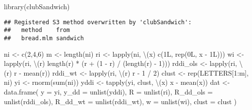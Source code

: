 \documentclass[12pt]{article}
\newenvironment{Shaded}{\begin{snugshade}}{\end{snugshade}}
\newcommand{\AttributeTok}[1]{\textcolor[rgb]{0.77,0.63,0.00}{#1}}
\newcommand{\DecValTok}[1]{\textcolor[rgb]{0.00,0.00,0.81}{#1}}
\newcommand{\FunctionTok}[1]{\textcolor[rgb]{0.00,0.00,0.00}{#1}}
\newcommand{\NormalTok}[1]{#1}
\newcommand{\OtherTok}[1]{\textcolor[rgb]{0.56,0.35,0.01}{#1}}
\newcommand{\SpecialCharTok}[1]{\textcolor[rgb]{0.00,0.00,0.00}{#1}}
\begin{document}
\begin{Shaded}
\begin{Highlighting}[]
\FunctionTok{library}\NormalTok{(clubSandwich)}
\end{Highlighting}
\end{Shaded}

\begin{verbatim}
## Registered S3 method overwritten by 'clubSandwich':
##   method    from    
##   bread.mlm sandwich
\end{verbatim}

\begin{Shaded}
\begin{Highlighting}[]
\NormalTok{ni }\OtherTok{\textless{}{-}} \FunctionTok{c}\NormalTok{(}\DecValTok{2}\NormalTok{,}\DecValTok{4}\NormalTok{,}\DecValTok{6}\NormalTok{)}
\NormalTok{m }\OtherTok{\textless{}{-}} \FunctionTok{length}\NormalTok{(ni)}
\NormalTok{ri }\OtherTok{\textless{}{-}} \FunctionTok{lapply}\NormalTok{(ni, \textbackslash{}(x) }\FunctionTok{c}\NormalTok{(1L, }\FunctionTok{rep}\NormalTok{(0L, x }\SpecialCharTok{{-}}\NormalTok{ 1L)))}
\NormalTok{wi }\OtherTok{\textless{}{-}} \FunctionTok{lapply}\NormalTok{(ri, \textbackslash{}(r) }\FunctionTok{length}\NormalTok{(r) }\SpecialCharTok{*}\NormalTok{ (r }\SpecialCharTok{+}\NormalTok{ (}\DecValTok{1} \SpecialCharTok{{-}}\NormalTok{ r) }\SpecialCharTok{/}\NormalTok{ (}\FunctionTok{length}\NormalTok{(r) }\SpecialCharTok{{-}} \DecValTok{1}\NormalTok{)))}
\NormalTok{rddi\_ols }\OtherTok{\textless{}{-}} \FunctionTok{lapply}\NormalTok{(ri, \textbackslash{}(r) r }\SpecialCharTok{{-}} \FunctionTok{mean}\NormalTok{(r))}
\NormalTok{rddi\_wt }\OtherTok{\textless{}{-}} \FunctionTok{lapply}\NormalTok{(ri, \textbackslash{}(r) r }\SpecialCharTok{{-}} \DecValTok{1} \SpecialCharTok{/} \DecValTok{2}\NormalTok{)}
\NormalTok{clust }\OtherTok{\textless{}{-}} \FunctionTok{rep}\NormalTok{(LETTERS[}\DecValTok{1}\SpecialCharTok{:}\NormalTok{m], ni)}
\NormalTok{yi }\OtherTok{\textless{}{-}} \FunctionTok{rnorm}\NormalTok{(}\FunctionTok{sum}\NormalTok{(ni))}
\NormalTok{yddi }\OtherTok{\textless{}{-}} \FunctionTok{tapply}\NormalTok{(yi, clust, \textbackslash{}(x) x }\SpecialCharTok{{-}} \FunctionTok{mean}\NormalTok{(x))}
\NormalTok{dat }\OtherTok{\textless{}{-}} \FunctionTok{data.frame}\NormalTok{(}
  \AttributeTok{y =}\NormalTok{ yi, }
  \AttributeTok{y\_dd =} \FunctionTok{unlist}\NormalTok{(yddi),}
  \AttributeTok{R =} \FunctionTok{unlist}\NormalTok{(ri),}
  \AttributeTok{R\_dd\_ols =} \FunctionTok{unlist}\NormalTok{(rddi\_ols),}
  \AttributeTok{R\_dd\_wt =} \FunctionTok{unlist}\NormalTok{(rddi\_wt),}
  \AttributeTok{w =} \FunctionTok{unlist}\NormalTok{(wi),}
  \AttributeTok{clust =}\NormalTok{ clust}
\NormalTok{)}


\end{Highlighting}
\end{Shaded}
\end{document}
